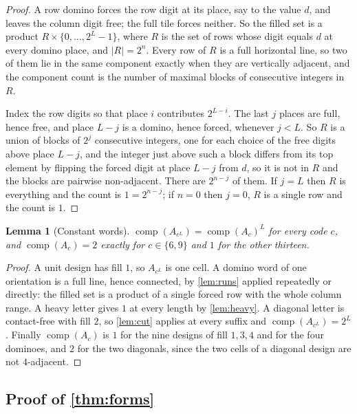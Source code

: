 \documentclass[11pt]{amsart}
\newtheorem{lemma}[theorem]{Lemma}
\theoremstyle{definition}
\theoremstyle{remark}
\DeclareMathOperator{\comp}{comp}
\begin{document}
\begin{proof}
A row domino forces the row digit at its place, say to the value $d$, and leaves the column digit free; the full tile forces neither. So the filled set is a product $R \times \{0, \dots, 2^L-1\}$, where $R$ is the set of rows whose digit equals $d$ at every domino place, and $|R| = 2^n$. Every row of $R$ is a full horizontal line, so two of them lie in the same component exactly when they are vertically adjacent, and the component count is the number of maximal blocks of consecutive integers in $R$.

Index the row digits so that place $i$ contributes $2^{L-i}$. The last $j$ places are full, hence free, and place $L-j$ is a domino, hence forced, whenever $j < L$. So $R$ is a union of blocks of $2^j$ consecutive integers, one for each choice of the free digits above place $L-j$, and the integer just above such a block differs from its top element by flipping the forced digit at place $L-j$ from $d$, so it is not in $R$ and the blocks are pairwise non-adjacent. There are $2^{n-j}$ of them. If $j = L$ then $R$ is everything and the count is $1 = 2^{n-j}$; if $n = 0$ then $j = 0$, $R$ is a single row and the count is $1$.
\end{proof}

\begin{lemma}[Constant words]
\label{lem:constant}
$\comp(A_{c^L}) = \comp(A_c)^L$ for every code $c$, and $\comp(A_c) = 2$ exactly for $c \in \{6,9\}$ and $1$ for the other thirteen.
\end{lemma}

\begin{proof}
A unit design has fill $1$, so $A_{c^L}$ is one cell. A domino word of one orientation is a full line, hence connected, by \cref{lem:runs} applied repeatedly or directly: the filled set is a product of a single forced row with the whole column range. A heavy letter gives $1$ at every length by \cref{lem:heavy}. A diagonal letter is contact-free with fill $2$, so \cref{lem:cut} applies at every suffix and $\comp(A_{c^L}) = 2^L$. Finally $\comp(A_c)$ is $1$ for the nine designs of fill $1, 3, 4$ and for the four dominoes, and $2$ for the two diagonals, since the two cells of a diagonal design are not $4$-adjacent.
\end{proof}

\subsection{Proof of \texorpdfstring{\cref{thm:forms}}{the closed forms}}
\end{document}

